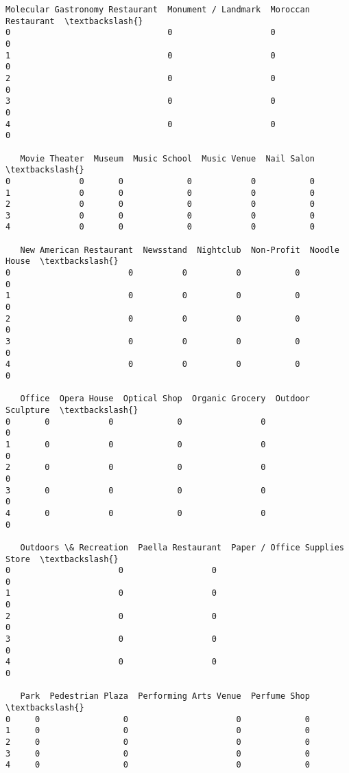 \documentclass[11pt]{article}
\begin{document}
\begin{tcolorbox}[breakable, size=fbox, boxrule=.5pt, pad at break*=1mm, opacityfill=0]
\begin{Verbatim}[commandchars=\\\{\}]
   Molecular Gastronomy Restaurant  Monument / Landmark  Moroccan Restaurant  \textbackslash{}
0                                0                    0                    0
1                                0                    0                    0
2                                0                    0                    0
3                                0                    0                    0
4                                0                    0                    0

   Movie Theater  Museum  Music School  Music Venue  Nail Salon  \textbackslash{}
0              0       0             0            0           0
1              0       0             0            0           0
2              0       0             0            0           0
3              0       0             0            0           0
4              0       0             0            0           0

   New American Restaurant  Newsstand  Nightclub  Non-Profit  Noodle House  \textbackslash{}
0                        0          0          0           0             0
1                        0          0          0           0             0
2                        0          0          0           0             0
3                        0          0          0           0             0
4                        0          0          0           0             0

   Office  Opera House  Optical Shop  Organic Grocery  Outdoor Sculpture  \textbackslash{}
0       0            0             0                0                  0
1       0            0             0                0                  0
2       0            0             0                0                  0
3       0            0             0                0                  0
4       0            0             0                0                  0

   Outdoors \& Recreation  Paella Restaurant  Paper / Office Supplies Store  \textbackslash{}
0                      0                  0                              0
1                      0                  0                              0
2                      0                  0                              0
3                      0                  0                              0
4                      0                  0                              0

   Park  Pedestrian Plaza  Performing Arts Venue  Perfume Shop  \textbackslash{}
0     0                 0                      0             0
1     0                 0                      0             0
2     0                 0                      0             0
3     0                 0                      0             0
4     0                 0                      0             0


\end{Verbatim}
\end{tcolorbox}
\end{document}
